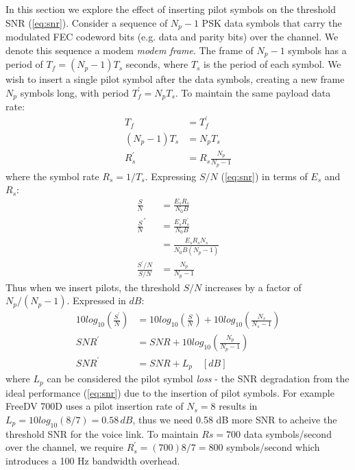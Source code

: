 \documentclass{article}
\begin{document}
In this section we explore the effect of inserting pilot symbols on the threshold SNR (\ref{eq:snr}). Consider a sequence of $N_p-1$ PSK data symbols that carry the modulated FEC codeword bits (e.g. data and parity bits) over the channel. We denote this sequence a modem \emph{modem frame}. The frame of $N_p-1$ symbols has a period of $T_f=(N_p-1)T_s$ seconds, where $T_s$ is the period of each symbol.  We wish to insert a single pilot symbol after the data symbols, creating a new frame $N_p$ symbols long, with period $T^\prime_f=N_pT_s$.  To maintain the same payload data rate:
\begin{equation}
\begin{split}
T_f &= T^\prime_f \\
(N_p-1)T_s &= N_pT_s \\
R^\prime_s &= R_s\frac{N_p}{N_p-1}
\end{split}
\end{equation}
where the symbol rate $R_s=1/T_s$.  Expressing $S/N$ (\ref{eq:snr}) in terms of $E_s$ and $R_s$:
\begin{equation}
\label{eq_snr_s}
\begin{split}
\frac{S}{N} &= \frac{E_sR_s}{N_0B} \\
\frac{S}{N}^\prime &= \frac{E_sR^\prime_s}{N_0B} \\
                   &= \frac{E_sR_sN_s}{N_0B(N_p-1)} \\
\frac{S^\prime/N}{S/N} &= \frac{N_p}{N_p-1}
\end{split}
\end{equation}
Thus when we insert pilots, the threshold $S/N$ increases by a factor of $N_p/(N_p-1)$. Expressed in $\si{dB}$:
\begin{equation}
\begin{split}
10log_{10}\left(\frac{S^\prime}{N}\right) &= 10log_{10}\left(\frac{S}{N}\right) + 10log_{10}\left(\frac{N_s}{N_s-1}\right) \\
SNR^\prime &= SNR + 10log_{10}\left(\frac{N_p}{N_p-1}\right) \\
SNR^\prime &= SNR + L_p  \quad [\si{dB}]
\end{split}
\end{equation}
where $L_p$ can be considered the pilot symbol \emph{loss} - the SNR degradation from the ideal performance (\ref{eq:snr}) due to the insertion of pilot symbols. For example FreeDV 700D uses a pilot insertion rate of $N_s=8$ results in $L_p=10log_{10}(8/7)=0.58 \, \si{dB}$, thus we need 0.58 dB more SNR to acheive the threshold SNR for the voice link.  To maintain $Rs=700$ data symbols/second over the channel, we require $R^\prime_s = (700)8/7 =800$ symbols/second which introduces a 100 Hz bandwidth overhead.
\end{document}
